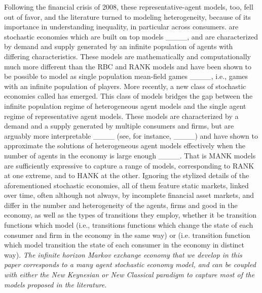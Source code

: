 Following the financial crisis of 2008, these representative-agent models, too, fell out of favor, and the literature turned to modeling heterogeneity, because of its importance in understanding inequality, in particular across consumers.
 are stochastic economies which 
are built on top  models ____, and are characterized by demand and supply generated by an infinite population of agents with differing characteristics. These models are mathematically and computationally much more different than the RBC and RANK models and have been shown to be possible to model as single population mean-field games ____, i.e., games with an infinite population of players. 
More recently, a new class of stochastic economies called  has emerged. This class of models bridges the gap between the infinite population regime of heterogeneous agent models and the single agent regime of representative agent models. These models are characterized by a demand and a supply generated by multiple consumers and firms, but are arguably more interpretable ____ (see, for instance, ____) and have shown to approximate the solutions of heterogeneous agent models effectively when the number of agents in the economy is large enough ____.
That is MANK models are sufficiently expressive to capture a range of models, corresponding to RANK at one extreme, and to HANK at the other.
Ignoring the stylized details of the aforementioned stochastic economies, all of them feature static markets, linked over time, often although not always, by incomplete financial asset markets, and differ in the number and heterogeneity of the agents, firms and good in the economy, as well as the types of transitions they employ, whether it be transition functions which model  (i.e., transitions functions which change the state of each consumer and firm in the economy in the same way)  or  (i.e. transition function which model transition the state of each consumer in the economy in distinct way).
\emph{The infinite horizon Markov exchange economy that we develop in this paper corresponds to a many agent stochastic economy model, and can be coupled with either the New Keynesian or New Classical paradigm to capture most of the models proposed in the literature.}





